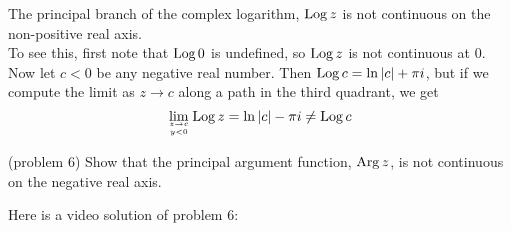 \documentclass[handout]{ximera}
\begin{document}
\begin{example}[example 6]
The principal branch of the complex logarithm, $\operatorname{Log} z$ is not continuous on the non-positive real axis.\\
To see this, first note that $\operatorname{Log} 0$ is undefined, so $\operatorname{Log} z$ is not continuous at $0$. Now let $c<0$ be any negative real number.
Then $\operatorname{Log} c = \ln |c| + \pi i$, but if we compute the limit as $z \to c$ along a path in the third quadrant, we get
\[
\lim_{z \to c \atop y < 0} \operatorname{Log} z = \ln|c| - \pi i \neq \operatorname{Log} c
\]
\end{example}

\begin{problem}(problem 6)
Show that the principal argument function, $\operatorname{Arg} z$, is not continuous on the negative real axis.
\end{problem}

Here is a video solution of problem 6:\\
\begin{foldable}
\end{foldable}
\end{document}
